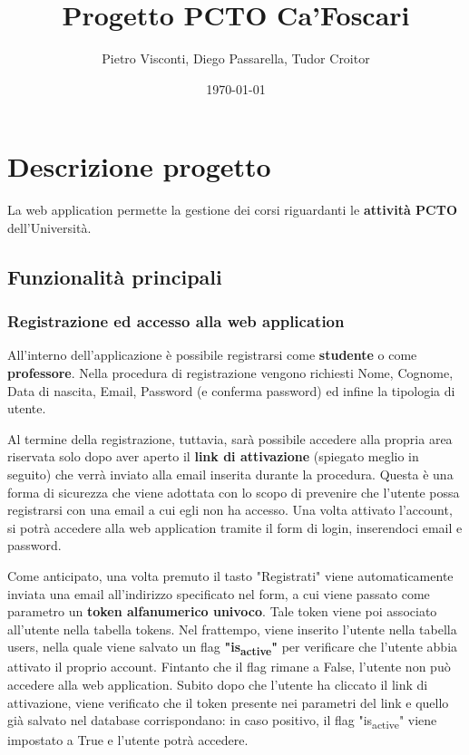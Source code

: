 \documentclass[11pt]{article}
\author{Pietro Visconti, Diego Passarella, Tudor Croitor}
\date{\today}
\title{Progetto PCTO Ca'Foscari}
\begin{document}
\maketitle
\tableofcontents


\section{Descrizione progetto}
\label{sec:org9700e83}
La web application permette la gestione dei corsi riguardanti le \textbf{attività PCTO} dell'Università.

\subsection{Funzionalità principali}
\label{sec:orgcffb255}

\subsubsection{Registrazione ed accesso alla web application}
\label{sec:org6159374}
All'interno dell'applicazione è possibile registrarsi come \textbf{studente} o come \textbf{professore}.
Nella procedura di registrazione vengono richiesti Nome, Cognome, Data di nascita, Email, Password (e conferma password) ed infine la tipologia di utente.

Al termine della registrazione, tuttavia, sarà possibile accedere alla propria area riservata solo dopo aver aperto il \textbf{link di attivazione} (spiegato meglio in seguito) che verrà inviato alla email inserita durante la procedura. Questa è una forma di sicurezza che viene adottata con lo scopo di prevenire che l'utente possa registrarsi con una email a cui egli non ha accesso. Una volta attivato l'account, si potrà accedere alla web application tramite il form di login, inserendoci email e password.

Come anticipato, una volta premuto il tasto "Registrati" viene automaticamente inviata una email all'indirizzo specificato nel form, a cui viene passato come parametro un \textbf{token alfanumerico univoco}. Tale token viene poi associato all'utente nella tabella tokens. Nel frattempo, viene inserito l'utente nella tabella users, nella quale viene salvato un flag \textbf{"is\textsubscript{active}"} per verificare che l'utente abbia attivato il proprio account. Fintanto che il flag rimane a False, l'utente non può accedere alla web application. Subito dopo che l'utente ha cliccato il link di attivazione, viene verificato che il token presente nei parametri del link e quello già salvato nel database corrispondano: in caso positivo, il flag "is\textsubscript{active}" viene impostato a True e l'utente potrà accedere.
\end{document}
